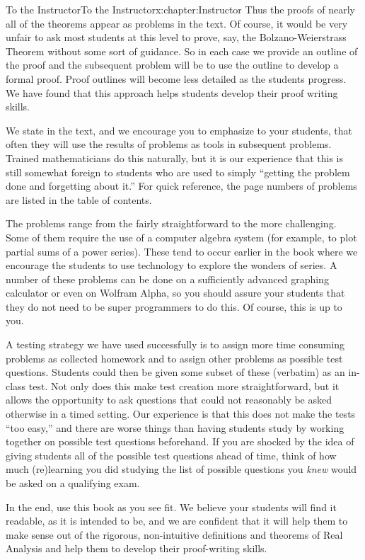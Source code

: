 \documentclass[oneside,10pt,]{book}
\numberwithin{equation}{section}
\begin{document}
\begin{chapterptx}{To the Instructor}{}{To the Instructor}{}{}{x:chapter:Instructor}
Thus the proofs of nearly all of the theorems appear as problems in the text. Of course, it would be very unfair to ask most students at this level to prove, say, the Bolzano-Weierstrass Theorem without some sort of guidance. So in each case we provide an outline of the proof and the subsequent problem will be to use the outline to develop a formal proof. Proof outlines will become less detailed as the students progress. We have found that this approach helps students develop their proof writing skills.%
\par
We state in the text, and we encourage you to emphasize to your students, that often they will use the results of problems as tools in subsequent problems. Trained mathematicians do this naturally, but it is our experience that this is still somewhat foreign to students who are used to simply ``getting the problem done and forgetting about it.'' For quick reference, the page numbers of problems are listed in the table of contents.%
\par
The problems range from the fairly straightforward to the more challenging. Some of them require the use of a computer algebra system (for example, to plot partial sums of a power series). These tend to occur earlier in the book where we encourage the students to use technology to explore the wonders of series. A number of these problems can be done on a sufficiently advanced graphing calculator or even on Wolfram Alpha, so you should assure your students that they do not need to be super programmers to do this. Of course, this is up to you.%
\par
A testing strategy we have used successfully is to assign more time consuming problems as collected homework and to assign other problems as possible test questions. Students could then be given some subset of these (verbatim) as an in-class test. Not only does this make test creation more straightforward, but it allows the opportunity to ask questions that could not reasonably be asked otherwise in a timed setting. Our experience is that this does not make the tests ``too easy,'' and there are worse things than having students study by working together on possible test questions beforehand. If you are shocked by the idea of giving students all of the possible test questions ahead of time, think of how much (re)learning you did studying the list of possible questions you \emph{knew} would be asked on a qualifying exam.%
\par
In the end, use this book as you see fit. We believe your students will find it readable, as it is intended to be, and we are confident that it will help them to make sense out of the rigorous, non-intuitive definitions and theorems of Real Analysis and help them to develop their proof-writing skills.%

\end{chapterptx}
\end{document}
